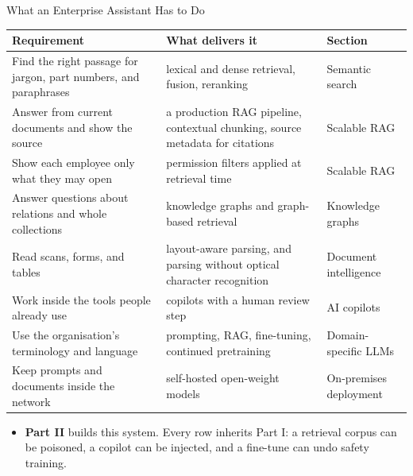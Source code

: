 \begin{frame}{What an Enterprise Assistant Has to Do}
  \centering
  {\scriptsize
  \begin{tabular}{>{\raggedright\arraybackslash}p{5.1cm} >{\raggedright\arraybackslash}p{4.8cm} >{\raggedright\arraybackslash}p{2.6cm}}
    \toprule
    \textbf{Requirement} & \textbf{What delivers it} & \textbf{Section} \\
    \midrule
    Find the right passage for jargon, part numbers, and paraphrases & lexical and dense retrieval, fusion, reranking & Semantic search \\
    \addlinespace[0.15em]
    Answer from current documents and show the source & a production RAG pipeline, contextual chunking, source metadata for citations & Scalable RAG \\
    \addlinespace[0.15em]
    Show each employee only what they may open & permission filters applied at retrieval time & Scalable RAG \\
    \addlinespace[0.15em]
    Answer questions about relations and whole collections & knowledge graphs and graph-based retrieval & Knowledge graphs \\
    \addlinespace[0.15em]
    Read scans, forms, and tables & layout-aware parsing, and parsing without optical character recognition & Document intelligence \\
    \addlinespace[0.15em]
    Work inside the tools people already use & copilots with a human review step & AI copilots \\
    \addlinespace[0.15em]
    Use the organisation's terminology and language & prompting, RAG, fine-tuning, continued pretraining & Domain-specific LLMs \\
    \addlinespace[0.15em]
    Keep prompts and documents inside the network & self-hosted open-weight models & On-premises deployment \\
    \bottomrule
  \end{tabular}\par}
  \vspace{0.6em}
  \begin{itemize}\footnotesize
    \item[\textcolor{red}{$\blacktriangleright$}] \textbf{Part II} builds this system. Every row inherits Part I: a retrieval corpus can be poisoned, a copilot can be injected, and a fine-tune can undo safety training.
  \end{itemize}
\end{frame}
